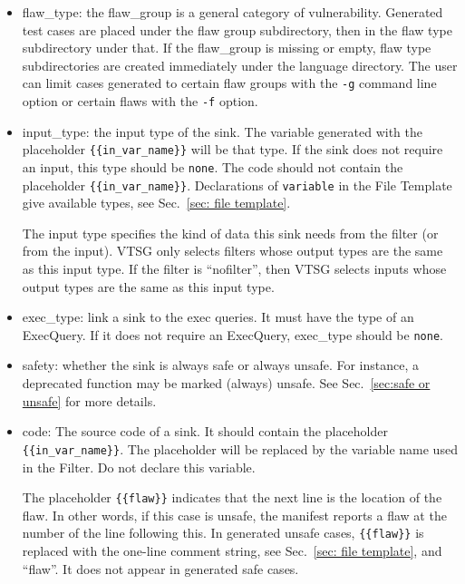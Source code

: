 \documentclass[12pt]{article}
\begin{document}
\begin{itemize}
    \item flaw\_type: the flaw\_group is a general category of vulnerability.
    Generated test cases are placed under the flaw group subdirectory, then
    in the flaw type subdirectory under that.  If the flaw\_group is missing or
    empty, flaw type subdirectories are created immediately under the language
    directory.
    The user can limit
    cases generated to certain flaw groups with the \verb|-g| command
    line option or certain flaws with the \verb|-f| option.
    
    \item input\_type: the input type of the sink. The variable
    generated with the placeholder \verb|{{in_var_name}}| will be 
    that type.  If the sink does not
    require an input, this type should be \verb|none|. The code 
    should not contain
    the placeholder \verb|{{in_var_name}}|.
    Declarations of \verb|variable| in the File Template give
    available types, see Sec.~\ref{sec: file template}.

    The input type specifies the kind of data this sink needs from the filter (or
    from the input).  VTSG only selects filters whose output types are the same as
    this input type.  If the filter is ``nofilter'', then VTSG selects inputs whose
    output types are the same as this input type.

    \item exec\_type: link a sink to the exec queries.  It must have 
    the type of
    an ExecQuery. If it does not require an ExecQuery, 
    exec\_type should be \verb|none|.

    \item safety: whether the sink is always safe or always unsafe.  For instance, a
      deprecated function may be marked (always) unsafe.
      See Sec.~\ref{sec:safe or unsafe}
      for more details.
    
    \item code: The source code of a sink. It should contain the placeholder
    \verb|{{in_var_name}}|.  The placeholder will be replaced by the variable
    name used in the Filter.  Do not declare this variable.

    The placeholder \verb|{{flaw}}| indicates that the next line is the location
    of the flaw.  In other words, if this case is unsafe, the manifest reports a
    flaw at the number of the line following this.  In generated unsafe cases,
    \verb|{{flaw}}| is replaced with the one-line comment string,
    see Sec.~\ref{sec: file template}, and ``flaw''.
    It does not appear in generated safe cases.
\end{itemize}
\end{document}
